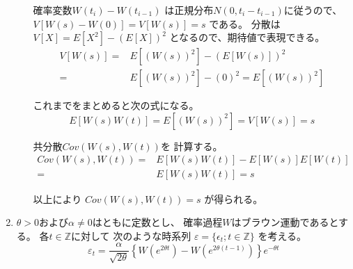 \documentclass[12pt,b5paper]{ltjsarticle}
\begin{document}
\begin{enumerate}
\begin{enumerate}
             確率変数$W(t_i)-W(t_{i-1})$
             は正規分布$N(0,t_i-t_{i-1})$に従うので、
             $V[W(s)-W(0)]=V[W(s)]=s$
             である。
             分散は
             $V[X] = E[X^2]-(E[X])^2$
             となるので、期待値で表現できる。
             \begin{align}
              V[W(s)] =& E[(W(s))^2] - (E[W(s)])^2\\
               =& E[(W(s))^2] - (0)^2
               = E[(W(s))^2]
             \end{align}

             これまでをまとめると次の式になる。
             \begin{equation}
              E[W(s)W(t)]
              = E[(W(s))^2]
              = V[W(s)]=s
             \end{equation}

             共分散$Cov(W(s),W(t))$を
             計算する。
             \begin{align}
              Cov(W(s),W(t))
               =& E[W(s)W(t)] - E[W(s)]E[W(t)]\\
               =& E[W(s)W(t)] =s
             \end{align}

             以上により
             $Cov(W(s),W(t))=s$
             が得られる。
             

             \hrulefill

      \end{enumerate}


 \item
      $\theta >0$および$\alpha \ne 0$はともに定数とし、
      確率過程$W$はブラウン運動であるとする。
      各$t\in\mathbb{Z}$に対して
      次のような時系列
      $\varepsilon=\{\epsilon_{t};t\in\mathbb{Z}\}$
      を考える。
      \begin{equation}
       \varepsilon_{t}=
        \frac{\alpha}{\sqrt{2\theta}} \left\{
         W \left( e^{2\theta t} \right)
         - W \left( e^{2\theta (t-1)} \right)
         \right\}
        e^{-\theta t}
      \end{equation}


\end{enumerate}
\end{document}
